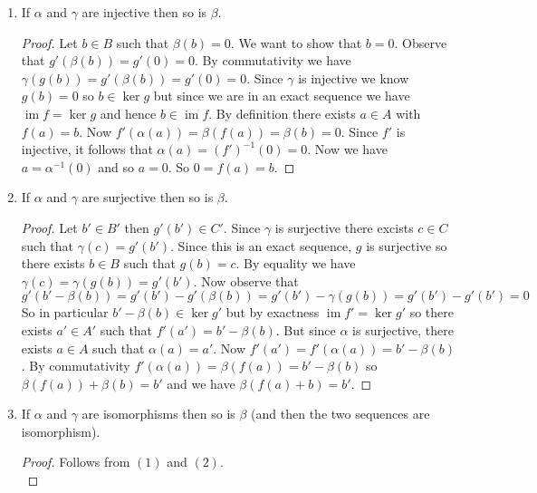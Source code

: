 \documentclass[8pt]{amsart}
\theoremstyle{plain}%
\theoremstyle{definition}
\theoremstyle{remark}
\numberwithin{equation}{section}
\newcommand{\im}{\operatorname{im}}
\begin{document}
	\begin{enumerate}
		\item If $\alpha$ and $\gamma$ are injective then so is $\beta$.
			\begin{proof}
				Let $b \in B$ such that $\beta(b) = 0$. We want to show that $b = 0$. Observe that $g'(\beta(b)) = g'(0) = 0$. By commutativity we have $\gamma(g(b)) = g'(\beta(b)) = g'(0) = 0$. Since $\gamma$ is injective we know $g(b) = 0$ so $b \in \ker g$ but since we are in an exact sequence we have $\im f = \ker g$ and hence $b \in \im f$. By definition there exists $a \in A$ with $f(a) = b$. Now $f'(\alpha(a)) = \beta(f(a)) = \beta(b) = 0$. Since $f'$ is injective, it follows that $\alpha(a) = (f')^{-1}(0) = 0$. Now we have $a = \alpha^{-1}(0)$ and so $a = 0$. So $0 = f(a) = b$.
			\end{proof}
		\item If $\alpha$ and $\gamma$ are surjective then so is $\beta$.
			\begin{proof}
				Let $b' \in B'$ then $g'(b') \in C'$. Since $\gamma$ is surjective there excists $c \in C$ such that $\gamma(c) = g'(b')$. Since this is an exact sequence, $g$ is surjective so there exists $b \in B$ such that $g(b) = c$. By equality we have $\gamma(c) = \gamma(g(b)) = g'(b')$. Now observe that $$g'(b' - \beta(b)) = g'(b') - g'(\beta(b)) = g'(b') - \gamma(g(b)) = g'(b') - g'(b') = 0$$ So in particular $b' - \beta(b) \in \ker g'$ but by exactness $\im f' = \ker g'$ so there exists $a' \in A'$ such that $f'(a') = b' - \beta(b)$. But since $\alpha$ is surjective, there exists $a \in A$ such that $\alpha(a) = a'$. Now $f'(a') = f'(\alpha(a)) = b' - \beta(b)$. By commutativity $f'(\alpha(a)) = \beta(f(a)) = b' - \beta(b)$ so $\beta(f(a)) + \beta(b) = b'$ and we have $\beta(f(a) + b) = b'$.
			\end{proof}
		\item If $\alpha$ and $\gamma$ are isomorphisms then so is $\beta$ (and then the two sequences are isomorphism).
			\begin{proof}
				Follows from $(1)$ and $(2)$.\\
			\end{proof}
	\end{enumerate}
\end{document}
